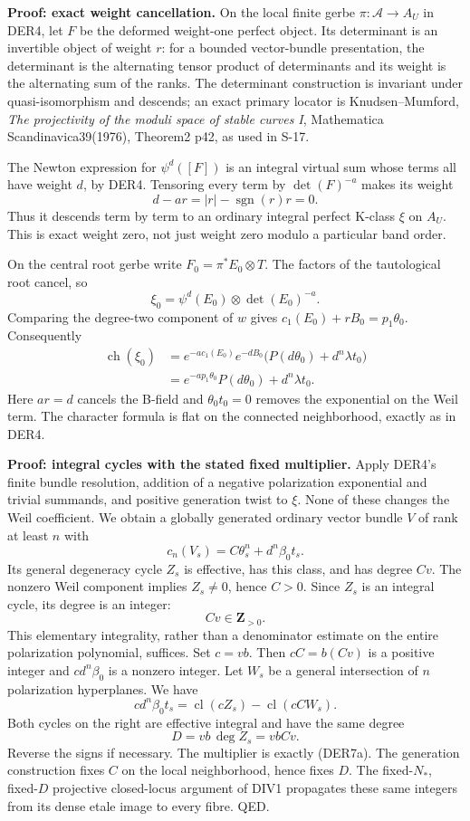 \documentclass[11pt,a4paper]{article}
\theoremstyle{definition}
\begin{document}
\textbf{Proof: exact weight cancellation.} On the local finite gerbe
\(\pi:\mathcal A\to A_U\) in DER4, let \(F\) be the deformed weight-one
perfect object. Its determinant is an invertible object of weight \(r\):
for a bounded vector-bundle presentation, the determinant is the
alternating tensor product of determinants and its weight is the
alternating sum of the ranks. The determinant construction is invariant
under quasi-isomorphism and descends; an exact primary locator is
Knudsen--Mumford, \emph{The projectivity of the moduli space of stable
curves I}, Mathematica Scandinavica39(1976), Theorem2 p42, as used in
S-17.

The Newton expression for \(\psi^d([F])\) is an integral virtual sum
whose terms all have weight \(d\), by DER4. Tensoring every term by
\(\det(F)^{-a}\) makes its weight \[
 d-ar=|r|-\operatorname{sgn}(r)r=0.
\] Thus it descends term by term to an ordinary integral perfect K-class
\(\xi\) on \(A_U\). This is exact weight zero, not just weight zero
modulo a particular band order.

On the central root gerbe write \(F_0=\pi^*E_0\otimes T\). The factors
of the tautological root cancel, so \[
 \xi_0=\psi^d(E_0)\otimes\det(E_0)^{-a}.
\] Comparing the degree-two component of \(w\) gives
\(c_1(E_0)+rB_0=p_1\theta_0\). Consequently \[
 \begin{aligned}
 \operatorname{ch}(\xi_0)
 &=e^{-a c_1(E_0)}e^{-dB_0}
       \bigl(P(d\theta_0)+d^n\lambda t_0\bigr)\\
 &=e^{-a p_1\theta_0}P(d\theta_0)+d^n\lambda t_0.
 \end{aligned}
\tag{DER7b}
\] Here \(ar=d\) cancels the B-field and \(\theta_0t_0=0\) removes the
exponential on the Weil term. The character formula is flat on the
connected neighborhood, exactly as in DER4.

\textbf{Proof: integral cycles with the stated fixed multiplier.} Apply
DER4's finite bundle resolution, addition of a negative polarization
exponential and trivial summands, and positive generation twist to
\(\xi\). None of these changes the Weil coefficient. We obtain a
globally generated ordinary vector bundle \(V\) of rank at least \(n\)
with \[
 c_n(V_s)=C\theta_s^n+d^n\beta_0t_s.
\] Its general degeneracy cycle \(Z_s\) is effective, has this class,
and has degree \(Cv\). The nonzero Weil component implies \(Z_s\ne0\),
hence \(C>0\). Since \(Z_s\) is an integral cycle, its degree is an
integer: \[
 Cv\in\mathbf Z_{>0}.
\tag{DER7c}
\] This elementary integrality, rather than a denominator estimate on
the entire polarization polynomial, suffices. Set \(c=vb\). Then
\(cC=b(Cv)\) is a positive integer and \(c d^n\beta_0\) is a nonzero
integer. Let \(W_s\) be a general intersection of \(n\) polarization
hyperplanes. We have \[
 c d^n\beta_0t_s
   =\operatorname{cl}(cZ_s)-\operatorname{cl}(cC W_s).
\] Both cycles on the right are effective integral and have the same
degree \[
 D=vb\,\deg Z_s=vbCv.
\tag{DER7d}
\] Reverse the signs if necessary. The multiplier is exactly (DER7a).
The generation construction fixes \(C\) on the local neighborhood, hence
fixes \(D\). The fixed-\(N_*\), fixed-\(D\) projective closed-locus
argument of DIV1 propagates these same integers from its dense etale
image to every fibre. QED.
\end{document}
